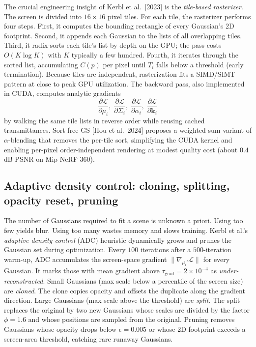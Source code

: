 The crucial engineering insight of Kerbl et al.~{[}2023{]} is the \emph{tile-based rasterizer}. The screen is divided into \(16{\times}16\) pixel tiles. For each tile, the rasterizer performs four steps. First, it computes the bounding rectangle of every Gaussian's 2D footprint. Second, it appends each Gaussian to the lists of all overlapping tiles. Third, it radix-sorts each tile's list by depth on the GPU; the pass costs \(O(K\log K)\) with \(K\) typically a few hundred. Fourth, it iterates through the sorted list, accumulating \(C(p)\) per pixel until \(T_i\) falls below a threshold (early termination). Because tiles are independent, rasterization fits a SIMD/SIMT pattern at close to peak GPU utilization. The backward pass, also implemented in CUDA, computes analytic gradients
\[\frac{\partial \mathcal{L}}{\partial \mu_i},\;\frac{\partial \mathcal{L}}{\partial \Sigma_i},\;\frac{\partial \mathcal{L}}{\partial \alpha_i},\;\frac{\partial \mathcal{L}}{\partial \mathbf{k}_i}\]
by walking the same tile lists in reverse order while reusing cached transmittances. Sort-free GS {[}Hou et al.~2024{]} proposes a weighted-sum variant of \(\alpha\)-blending that removes the per-tile sort, simplifying the CUDA kernel and enabling per-pixel order-independent rendering at modest quality cost (about \(0.4\) dB PSNR on Mip-NeRF 360).

\subsection{Adaptive density control: cloning, splitting, opacity reset, pruning}\label{adaptive-density-control-cloning-splitting-opacity-reset-pruning}

The number of Gaussians required to fit a scene is unknown a priori. Using too few yields blur. Using too many wastes memory and slows training. Kerbl et al.'s \emph{adaptive density control} (ADC) heuristic dynamically grows and prunes the Gaussian set during optimization. Every \(100\) iterations after a \(500\)-iteration warm-up, ADC accumulates the screen-space gradient \(\|\nabla_{\mu_i'}\mathcal{L}\|\) for every Gaussian. It marks those with mean gradient above \(\tau_{\mathrm{grad}}=2\times 10^{-4}\) as \emph{under-reconstructed}. Small Gaussians (max scale below a percentile of the screen size) are \emph{cloned}. The clone copies opacity and offsets the duplicate along the gradient direction. Large Gaussians (max scale above the threshold) are \emph{split}. The split replaces the original by two new Gaussians whose scales are divided by the factor \(\phi=1.6\) and whose positions are sampled from the original. Pruning removes Gaussians whose opacity drops below \(\epsilon=0.005\) or whose 2D footprint exceeds a screen-area threshold, catching rare runaway Gaussians.


